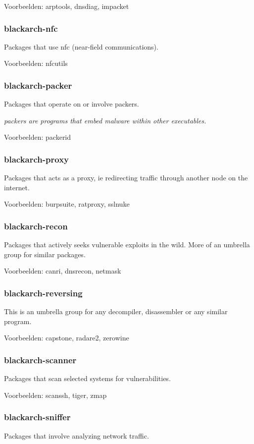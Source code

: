 \documentclass[a4paper, oneside, 11pt]{book}
\begin{document}
Voorbeelden: arptools, dnsdiag, impacket

\subsubsection{blackarch-nfc}
Packages that use nfc (near-field communications).

Voorbeelden: nfcutils

\subsubsection{blackarch-packer}
Packages that operate on or involve packers.

\textit{packers are programs that embed malware within other executables.}

Voorbeelden: packerid

\subsubsection{blackarch-proxy}
Packages that acts as a proxy, ie redirecting traffic
through another node on the internet.

Voorbeelden: burpsuite, ratproxy, sslnuke

\subsubsection{blackarch-recon}
Packages that actively seeks vulnerable exploits in the
wild. More of an umbrella group for similar packages.

Voorbeelden: canri, dnsrecon, netmask

\subsubsection{blackarch-reversing}
This is an umbrella group for any decompiler,
disassembler or any similar program.

Voorbeelden: capstone, radare2, zerowine

\subsubsection{blackarch-scanner}
Packages that scan selected systems for vulnerabilities.

Voorbeelden: scanssh, tiger, zmap

\subsubsection{blackarch-sniffer}
Packages that involve analyzing network traffic.
\end{document}
